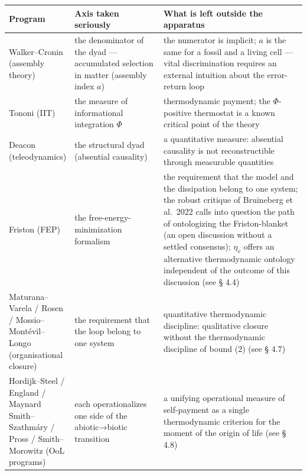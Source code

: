 \documentclass[pdflatex,sn-mathphys-ay]{sn-jnl}
\begin{document}
\begin{center}\small
\begin{tabular}{@{} >{\raggedright\arraybackslash}p{0.1324\linewidth} >{\raggedright\arraybackslash}p{0.3235\linewidth} >{\raggedright\arraybackslash}p{0.5441\linewidth}@{}}
\toprule
\begin{minipage}[b]{\linewidth}\raggedright
Program
\end{minipage} & \begin{minipage}[b]{\linewidth}\raggedright
Axis taken seriously
\end{minipage} & \begin{minipage}[b]{\linewidth}\raggedright
What is left outside the apparatus
\end{minipage} \\
\midrule
Walker--Cronin (assembly theory) & the denominator of the dyad --- accumulated selection in matter (assembly index \(a\)) & the numerator is implicit; \(a\) is the same for a fossil and a living cell --- vital discrimination requires an external intuition about the error-return loop \\
Tononi (IIT) & the measure of informational integration \(\Phi\) & thermodynamic payment; the \(\Phi\)-positive thermostat is a known critical point of the theory \\
Deacon (teleodynamics) & the structural dyad (absential causality) & a quantitative measure: absential causality is not reconstructible through measurable quantities \\
Friston (FEP) & the free-energy-minimization formalism & the requirement that the model and the dissipation belong to one system; the robust critique of Bruineberg et al.~2022 calls into question the path of ontologizing the Friston-blanket (an open discussion without a settled consensus); \(\eta_v\) offers an alternative thermodynamic ontology independent of the outcome of this discussion (see § 4.4) \\
Maturana--Varela / Rosen / Mossio--Montévil--Longo (organisational closure) & the requirement that the loop belong to one system & quantitative thermodynamic discipline: qualitative closure without the thermodynamic discipline of bound (2) (see § 4.7) \\
Hordijk--Steel / England / Maynard Smith--Szathmáry / Pross / Smith--Morowitz (OoL programs) & each operationalizes one side of the abiotic→biotic transition & a unifying operational measure of self-payment as a single thermodynamic criterion for the moment of the origin of life (see § 4.8) \\
\bottomrule
\end{tabular}
\end{center}
\end{document}
